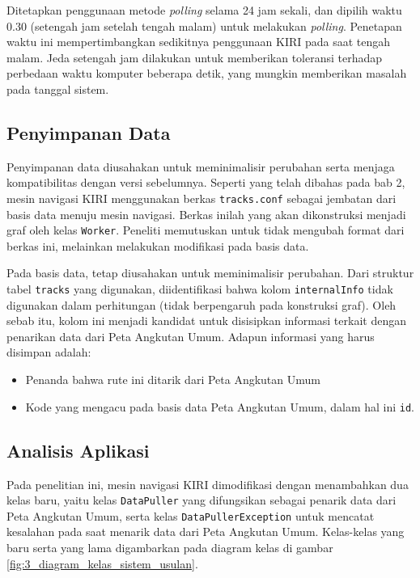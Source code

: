 Ditetapkan penggunaan metode \textit{polling} selama 24 jam sekali, dan dipilih waktu 0.30 (setengah jam setelah tengah malam) untuk melakukan \textit{polling}. Penetapan waktu ini mempertimbangkan sedikitnya penggunaan KIRI pada saat tengah malam. Jeda setengah jam dilakukan untuk memberikan toleransi terhadap perbedaan waktu komputer beberapa detik, yang mungkin memberikan masalah pada tanggal sistem. 

\subsection{Penyimpanan Data}

Penyimpanan data diusahakan untuk meminimalisir perubahan serta menjaga kompatibilitas dengan versi sebelumnya. Seperti yang telah dibahas pada bab 2, mesin navigasi KIRI menggunakan berkas \texttt{tracks.conf} sebagai jembatan dari basis data menuju mesin navigasi. Berkas inilah yang akan dikonstruksi menjadi graf oleh kelas \texttt{Worker}. Peneliti memutuskan untuk tidak mengubah format dari berkas ini, melainkan melakukan modifikasi pada basis data.

Pada basis data, tetap diusahakan untuk meminimalisir perubahan. Dari struktur tabel \texttt{tracks} yang digunakan, diidentifikasi bahwa kolom \texttt{internalInfo} tidak digunakan dalam perhitungan (tidak berpengaruh pada konstruksi graf). Oleh sebab itu, kolom ini menjadi kandidat untuk disisipkan informasi terkait dengan penarikan data dari Peta Angkutan Umum. Adapun informasi yang harus disimpan adalah:

\begin{itemize}
	\item Penanda bahwa rute ini ditarik dari Peta Angkutan Umum
	\item Kode yang mengacu pada basis data Peta Angkutan Umum, dalam hal ini \texttt{id}.
\end{itemize}

\subsection{Analisis Aplikasi}

Pada penelitian ini, mesin navigasi KIRI dimodifikasi dengan menambahkan dua kelas baru, yaitu kelas \texttt{DataPuller} yang difungsikan sebagai penarik data dari Peta Angkutan Umum, serta kelas \texttt{DataPullerException} untuk mencatat kesalahan pada saat menarik data dari Peta Angkutan Umum. Kelas-kelas yang baru serta yang lama digambarkan pada diagram kelas di gambar \ref{fig:3_diagram_kelas_sistem_usulan}.

